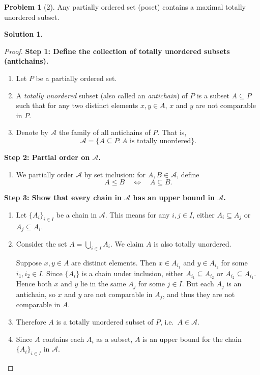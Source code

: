 \documentclass[12pt]{article}
\theoremstyle{definition} %
\newtheorem{solution}{Solution}
\newtheorem{problem}{Problem}
\theoremstyle{plain} %
\begin{document}
\begin{problem}[2]
    Any partially ordered set (poset) contains a maximal totally unordered subset.
\end{problem}
\begin{solution}

        \begin{proof}

        \noindent

        \textbf{Step 1: Define the collection of totally unordered subsets (antichains).}
        \begin{enumerate}
            \item Let $P$ be a partially ordered set.
            \item A \emph{totally unordered} subset (also called an \emph{antichain}) of $P$ is a subset $A \subseteq P$ such that for any two distinct elements $x,y \in A$, $x$ and $y$ are not comparable in $P$.
            \item Denote by $\mathcal{A}$ the family of all antichains of $P$. That is,
            \[
                \mathcal{A} = \{ A \subseteq P : A \text{ is totally unordered} \}.
            \]
        \end{enumerate}
        
        \noindent
        \textbf{Step 2: Partial order on $\mathcal{A}$.}
        \begin{enumerate}
            \item We partially order $\mathcal{A}$ by set inclusion: for $A, B \in \mathcal{A}$, define
            \[
                A \leq B \quad \Longleftrightarrow \quad A \subseteq B.
            \]
        \end{enumerate}
        
        \noindent
        \textbf{Step 3: Show that every chain in $\mathcal{A}$ has an upper bound in $\mathcal{A}$.}
        \begin{enumerate}
            \item Let $\{A_i\}_{i \in I}$ be a chain in $\mathcal{A}$. This means for any $i, j \in I$, either $A_i \subseteq A_j$ or $A_j \subseteq A_i$.
            \item Consider the set $A = \bigcup_{i \in I} A_i$. We claim $A$ is also totally unordered.
        
            Suppose $x, y \in A$ are distinct elements. Then $x \in A_{i_1}$ and $y \in A_{i_2}$ for some $i_1, i_2 \in I$. Since $\{A_i\}$ is a chain under inclusion, either $A_{i_1} \subseteq A_{i_2}$ or $A_{i_2} \subseteq A_{i_1}$. Hence both $x$ and $y$ lie in the same $A_j$ for some $j \in I$. But each $A_j$ is an antichain, so $x$ and $y$ are not comparable in $A_j$, and thus they are not comparable in $A$. 
            \item Therefore $A$ is a totally unordered subset of $P$, i.e.\ $A \in \mathcal{A}$.
            \item Since $A$ contains each $A_i$ as a subset, $A$ is an upper bound for the chain $\{A_i\}_{i \in I}$ in $\mathcal{A}$.
        \end{enumerate}
        

\end{proof}
\end{solution}
\end{document}
